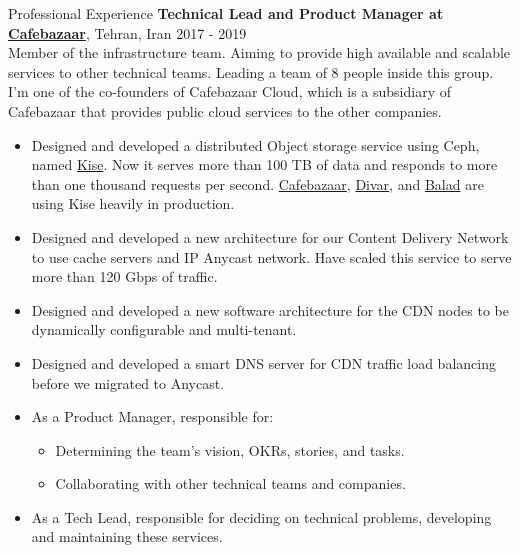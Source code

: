 \documentclass{resume} %
\begin{document}
\begin{rSection}{Professional Experience}
	{\bf Technical Lead and Product Manager at \href{https://cafebazaar.ir/}{Cafebazaar}}, Tehran, Iran \hfill 2017 - 2019
	\\ Member of the infrastructure team. Aiming to provide high available and scalable services to other technical teams. Leading a team of 8 people inside this group. I'm one of the co-founders of Cafebazaar Cloud, which is a subsidiary of Cafebazaar that provides public cloud services to the other companies.
	\begin{itemize}
		\item Designed and developed a distributed Object storage service using Ceph, named \href{https://kise.roo.cloud/}{Kise}. Now it serves more than 100 TB of data and responds to more than one thousand requests per second. \href{https://cafebazaar.ir/}{Cafebazaar}, \href{https://divar.ir/}{Divar}, and \href{http://balad.ir/}{Balad} are using Kise heavily in production.
		\item Designed and developed a new architecture for our Content Delivery Network to use cache servers and IP Anycast network. Have scaled this service to serve more than 120 Gbps of traffic.
		\item Designed and developed a new software architecture for the CDN nodes to be dynamically configurable and multi-tenant.
		\item Designed and developed a smart DNS server for CDN traffic load balancing before we migrated to Anycast.
		\item As a Product Manager, responsible for:
		\begin{itemize}
			\item Determining the team's vision, OKRs, stories, and tasks.
			\item Collaborating with other technical teams and companies.
		\end{itemize}
		\item As a Tech Lead, responsible for deciding on technical problems, developing and maintaining these services.
	\end{itemize}
	

\end{rSection}
\end{document}
